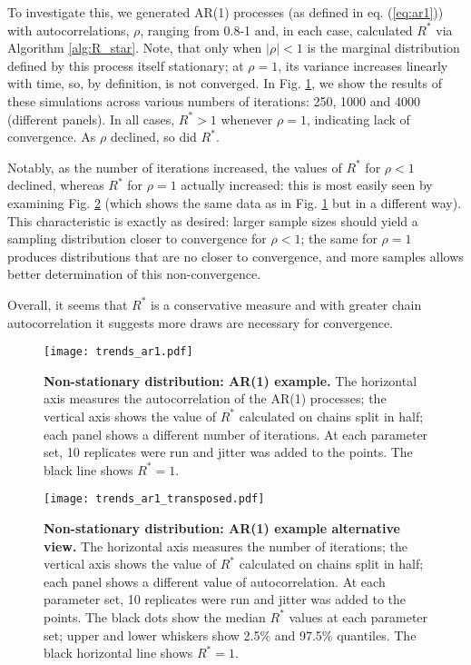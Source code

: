 \documentclass{article}
\begin{document}
To investigate this, we generated AR(1) processes (as defined in eq. (\ref{eq:ar1})) with autocorrelations, $\rho$, ranging from 0.8-1 and, in each case, calculated $R^*$ via Algorithm \ref{alg:R_star}. Note, that only when $|\rho|<1$ is the marginal distribution defined by this process itself stationary; at $\rho=1$, its variance increases linearly with time, so, by definition, is not converged. In Fig. \ref{fig:trends_ar1}, we show the results of these simulations across various numbers of iterations: 250, 1000 and 4000 (different panels). In all cases, $R^*>1$ whenever $\rho=1$, indicating lack of convergence. As $\rho$ declined, so did $R^*$.

Notably, as the number of iterations increased, the values of $R^*$ for $\rho<1$ declined, whereas $R^*$ for $\rho=1$ actually increased: this is most easily seen by examining Fig. \ref{fig:trends_ar1_transposed} (which shows the same data as in Fig. \ref{fig:trends_ar1} but in a different way). This characteristic is exactly as desired: larger sample sizes should yield a sampling distribution closer to convergence for $\rho<1$; the same for $\rho=1$ produces distributions that are no closer to convergence, and more samples allows better determination of this non-convergence.

Overall, it seems that $R^*$ is a conservative measure and with greater chain autocorrelation it suggests more draws are necessary for convergence.

\begin{figure}[!htb]
	\centerline{\texttt{[image: trends\_ar1.pdf]}}
	\caption{\textbf{Non-stationary distribution: AR(1) example.} The horizontal axis measures the autocorrelation of the AR(1) processes; the vertical axis shows the value of $R^*$ calculated on chains split in half; each panel shows a different number of iterations. At each parameter set, 10 replicates were run and jitter was added to the points. The black line shows $R^*=1$.}
	\label{fig:trends_ar1}
\end{figure}

\begin{figure}[!htb]
	\centerline{\texttt{[image: trends\_ar1\_transposed.pdf]}}
	\caption{\textbf{Non-stationary distribution: AR(1) example alternative view.} The horizontal axis measures the number of iterations; the vertical axis shows the value of $R^*$ calculated on chains split in half; each panel shows a different value of autocorrelation. At each parameter set, 10 replicates were run and jitter was added to the points. The black dots show the median $R^*$ values at each parameter set; upper and lower whiskers show 2.5\% and 97.5\% quantiles. The black horizontal line shows $R^*=1$. }
	\label{fig:trends_ar1_transposed}
\end{figure}
\end{document}
